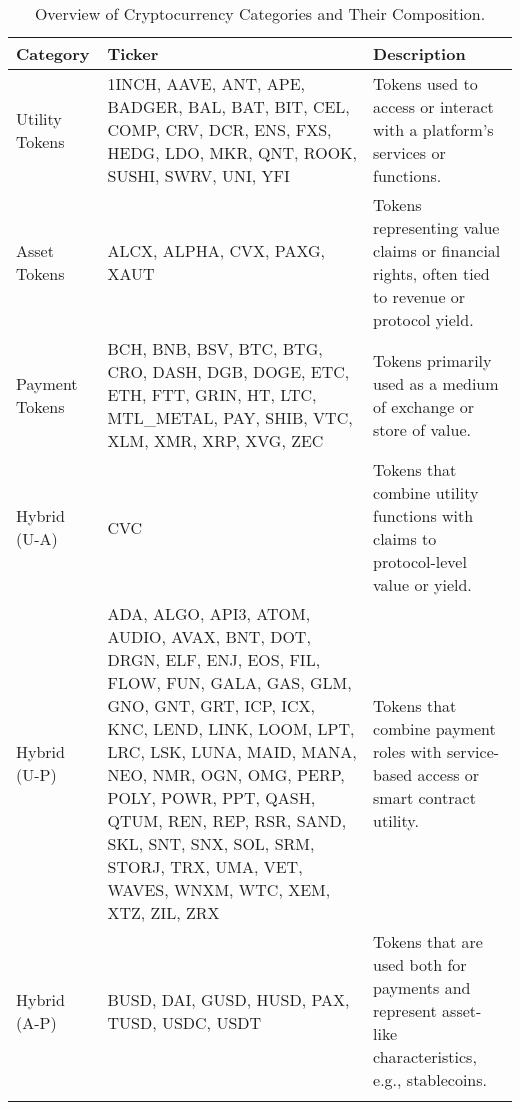 \begin{table}[ht]
\centering
\scriptsize
\setlength{\tabcolsep}{4pt}
\begin{tabular}{p{3cm}p{8cm}p{4cm}}
\toprule
\textbf{Category} & \textbf{Ticker} & \textbf{Description} \\
\midrule
Utility Tokens & 1INCH, AAVE, ANT, APE, BADGER, BAL, BAT, BIT, CEL, COMP, CRV, DCR, ENS, FXS, HEDG, LDO, MKR, QNT, ROOK, SUSHI, SWRV, UNI, YFI & Tokens used to access or interact with a platform’s services or functions. \\
\addlinespace
Asset Tokens & ALCX, ALPHA, CVX, PAXG, XAUT & Tokens representing value claims or financial rights, often tied to revenue or protocol yield. \\
\addlinespace
Payment Tokens & BCH, BNB, BSV, BTC, BTG, CRO, DASH, DGB, DOGE, ETC, ETH, FTT, GRIN, HT, LTC, MTL_METAL, PAY, SHIB, VTC, XLM, XMR, XRP, XVG, ZEC & Tokens primarily used as a medium of exchange or store of value. \\
\addlinespace
Hybrid (U-A) & CVC & Tokens that combine utility functions with claims to protocol-level value or yield. \\
\addlinespace
Hybrid (U-P) & ADA, ALGO, API3, ATOM, AUDIO, AVAX, BNT, DOT, DRGN, ELF, ENJ, EOS, FIL, FLOW, FUN, GALA, GAS, GLM, GNO, GNT, GRT, ICP, ICX, KNC, LEND, LINK, LOOM, LPT, LRC, LSK, LUNA, MAID, MANA, NEO, NMR, OGN, OMG, PERP, POLY, POWR, PPT, QASH, QTUM, REN, REP, RSR, SAND, SKL, SNT, SNX, SOL, SRM, STORJ, TRX, UMA, VET, WAVES, WNXM, WTC, XEM, XTZ, ZIL, ZRX & Tokens that combine payment roles with service-based access or smart contract utility. \\
\addlinespace
Hybrid (A-P) & BUSD, DAI, GUSD, HUSD, PAX, TUSD, USDC, USDT & Tokens that are used both for payments and represent asset-like characteristics, e.g., stablecoins. \\
\addlinespace
\bottomrule
\end{tabular}
\caption{Overview of Cryptocurrency Categories and Their Composition.}
\label{tab:H2groups}
\end{table}
